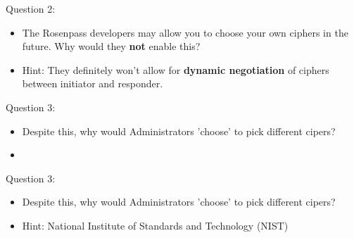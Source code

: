 \documentclass{rosenpass-beamer}
\begin{document}

\begin{frame}{Question 2:}
\begin{itemize}
  \item The Rosenpass developers may allow you to choose your own ciphers in the future.
    Why would they \textbf{not} enable this?
  \item Hint: They definitely won't allow for \textbf{dynamic negotiation} of ciphers between initiator and responder.
\end{itemize}
\end{frame}


\begin{frame}{Question 3:}
\begin{itemize}
  \item Despite this, why would Administrators 'choose' to pick different cipers?
  \item 
\end{itemize}
\end{frame}


\begin{frame}{Question 3:}
\begin{itemize}
  \item Despite this, why would Administrators 'choose' to pick different cipers?
  \item Hint: National Institute of Standards and Technology (NIST)
\end{itemize}
\end{frame}


\setcounter{framenumber}{\totalcontentframes}
\end{document}
